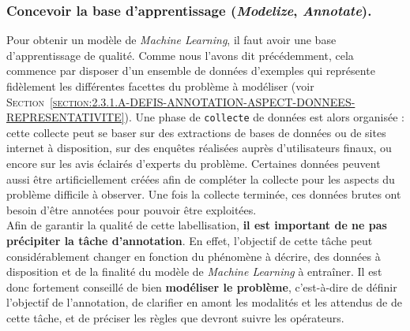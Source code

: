 		\subsubsection{Concevoir la base d'apprentissage (\textit{\textbf{M}odelize}, \textit{\textbf{A}nnotate}).}
		\label{section:2.2.1.A-ORGANISATION-ANNOTATION-ETAPES-CLES-MODELIZE-ANNOTATE}
		
			Pour obtenir un modèle de \textit{Machine Learning}, il faut avoir une base d’apprentissage de qualité.
			Comme nous l'avons dit précédemment, cela commence par disposer d'un ensemble de données d'exemples qui représente fidèlement les différentes facettes du problème à modéliser (voir \textsc{Section~\ref{section:2.3.1.A-DEFIS-ANNOTATION-ASPECT-DONNEES-REPRESENTATIVITE}}).
			Une phase de \texttt{collecte} de données est alors organisée : cette collecte peut se baser sur des extractions de bases de données ou de sites internet à disposition, sur des enquêtes réalisées auprès d'utilisateurs finaux, ou encore sur les avis éclairés d'experts du problème.
			Certaines données peuvent aussi être artificiellement créées afin de compléter la collecte pour les aspects du problème difficile à observer.
			Une fois la collecte terminée, ces données brutes ont besoin d'être annotées pour pouvoir être exploitées. \\
			
			
			Afin de garantir la qualité de cette labellisation, \textbf{il est important de ne pas précipiter la tâche d'annotation}.
			En effet, l'objectif de cette tâche peut considérablement changer en fonction du phénomène à décrire, des données à disposition et de la finalité du modèle de \textit{Machine Learning} à entraîner.
			Il est donc fortement conseillé de bien \textbf{modéliser le problème}, c'est-à-dire de définir l'objectif de l'annotation, de clarifier en amont les modalités et les attendus de de cette tâche, et de préciser les règles que devront suivre les opérateurs.
			
